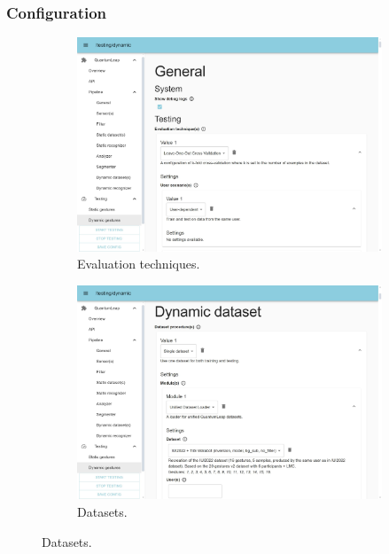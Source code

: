 \subsubsection{Configuration} \label{sec:quantumleap-testing:description:ql-integration:configuration}

\begin{figure}[bt]
  \centering
  \begin{subfigure}{.495\textwidth}
      \centering
      \includegraphics[width=\linewidth]{Figures/QuantumLeapTesting/QL-Testing-EvaluationTechnique.pdf}  
      \vspace{-15pt}
      \captionsetup{width=.9\linewidth}
      \caption{Evaluation techniques.}
      \label{fig:quantumleap-testing:ui:1}
  \end{subfigure}
  \begin{subfigure}{.495\textwidth}
      \centering
      \includegraphics[width=\linewidth]{Figures/QuantumLeapTesting/QL-Testing-Dataset.pdf}  
      \vspace{-15pt}
      \captionsetup{width=.9\linewidth}
      \caption{Datasets.}
      \label{fig:quantumleap-testing:ui:2}
  \end{subfigure}
  

\end{figure}
